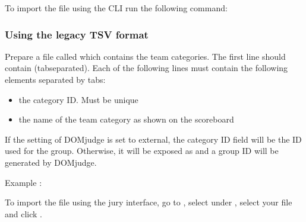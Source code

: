 \documentclass[a4paper,10pt,english,openany]{sphinxmanual}
\begin{document}
\sphinxAtStartPar
To import the file using the CLI run the following command:

\begin{sphinxVerbatim}[commandchars=\\\{\}]
      
\end{sphinxVerbatim}


\subsubsection{Using the legacy TSV format}
\label{\detokenize{import:using-the-legacy-tsv-format}}
\sphinxAtStartPar
Prepare a file called  which contains the team categories.
The first line should contain  (tab\sphinxhyphen{}separated).
Each of the following lines must contain the following elements separated by tabs:
\begin{itemize}
\item {} 
\sphinxAtStartPar
the category ID. Must be unique

\item {} 
\sphinxAtStartPar
the name of the team category as shown on the scoreboard

\end{itemize}

\sphinxAtStartPar
If the  setting of DOMjudge is set to external, the category ID field will be
the ID used for the group. Otherwise, it will be exposed as  and a group ID will
be generated by DOMjudge.

\sphinxAtStartPar
Example :

\begin{sphinxVerbatim}[commandchars=\\\{\}]
   
        
   
   
\end{sphinxVerbatim}

\sphinxAtStartPar
To import the file using the jury interface, go to , select
 under , select your file and click .
\end{document}
